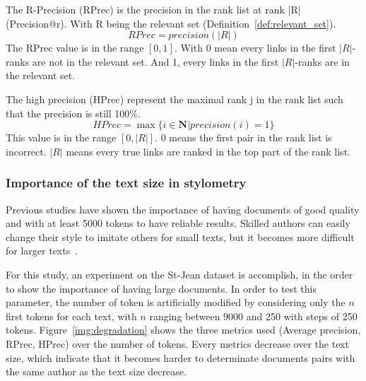 \begin{definition}
  The R-Precision (RPrec) is the precision in the rank list at rank |R| (Precision@r).
  With R being the relevant set (Definition~\ref{def:relevant_set}).
  \begin{equation}
    RPrec = precision(|R|)
  \end{equation}
  The RPrec value is in the range $\left[0, 1\right]$.
  With 0 mean every links in the first $|R|$-ranks are not in the relevant set.
  And 1, every links in the first $|R|$-ranks are in the relevant set.
\end{definition}

\begin{definition}
  The high precision (HPrec) represent the maximal rank j in the rank list such that the precision is still 100\%.
  \begin{equation}
    HPrec = \max\{i \in \mathbf{N} | precision(i) = 1\}
  \end{equation}
  This value is in the range $\left[0, |R|\right]$.
  $0$ means the first pair in the rank list is incorrect.
  $|R|$ means every true links are ranked in the top part of the rank list.
\end{definition}

\subsubsection{Importance of the text size in stylometry}

Previous studies have shown the importance of having documents of good quality and with at least 5000 tokens to have reliable results.
Skilled authors can easily change their style to imitate others for small texts, but it becomes more difficult for larger texts~\cite{savoy_stylo}.

For this study, an experiment on the St-Jean dataset is accomplish, in the order to show the importance of having large documents.
In order to test this parameter, the number of token is artificially modified by considering only the $n$ first tokens for each text, with $n$ ranging between 9000 and 250 with steps of 250 tokens.
Figure~\ref{img:degradation} shows the three metrics used (Average precision, RPrec, HPrec) over the number of tokens.
Every metrics decrease over the text size, which indicate that it becomes harder to determinate documents pairs with the same author as the text size decrease.

